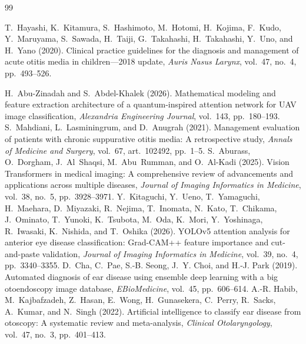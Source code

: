 \documentclass[12pt,a4paper]{report}
\begin{document}
\begin{thebibliography}{99}
\sloppy
\setlength{\itemsep}{0.45\baselineskip}
\setlength{\parskip}{0pt}

T.~Hayashi, K.~Kitamura, S.~Hashimoto, M.~Hotomi, H.~Kojima, F.~Kudo, Y.~Maruyama, S.~Sawada, H.~Taiji, G.~Takahashi, H.~Takahashi, Y.~Uno, and H.~Yano (2020). Clinical practice guidelines for the diagnosis and management of acute otitis media in children---2018 update, \textit{Auris Nasus Larynx}, vol.~47, no.~4, pp.~493--526.

H.~Abu-Zinadah and S.~Abdel-Khalek (2026). Mathematical modeling and feature extraction architecture of a quantum-inspired attention network for UAV image classification, \textit{Alexandria Engineering Journal}, vol.~143, pp.~180--193.
S.~Mahdiani, L.~Lasminingrum, and D.~Anugrah (2021). Management evaluation of patients with chronic suppurative otitis media: A retrospective study, \textit{Annals of Medicine and Surgery}, vol.~67, art.~102492, pp.~1--5.
S.~Aburass, O.~Dorgham, J.~Al~Shaqsi, M.~Abu~Rumman, and O.~Al-Kadi (2025). Vision Transformers in medical imaging: A comprehensive review of advancements and applications across multiple diseases, \textit{Journal of Imaging Informatics in Medicine}, vol.~38, no.~5, pp.~3928--3971.
Y.~Kitaguchi, Y.~Ueno, T.~Yamaguchi, H.~Maehara, D.~Miyazaki, R.~Nejima, T.~Inomata, N.~Kato, T.~Chikama, J.~Ominato, T.~Yunoki, K.~Tsubota, M.~Oda, K.~Mori, Y.~Yoshinaga, R.~Iwasaki, K.~Nishida, and T.~Oshika (2026). YOLOv5 attention analysis for anterior eye disease classification: Grad-CAM++ feature importance and cut-and-paste validation, \textit{Journal of Imaging Informatics in Medicine}, vol.~39, no.~4, pp.~3340--3355.
D.~Cha, C.~Pae, S.-B. Seong, J.~Y. Choi, and H.-J. Park (2019). Automated diagnosis of ear disease using ensemble deep learning with a big otoendoscopy image database, \textit{EBioMedicine}, vol.~45, pp.~606--614.
A.-R. Habib, M.~Kajbafzadeh, Z.~Hasan, E.~Wong, H.~Gunasekera, C.~Perry, R.~Sacks, A.~Kumar, and N.~Singh (2022). Artificial intelligence to classify ear disease from otoscopy: A systematic review and meta-analysis, \textit{Clinical Otolaryngology}, vol.~47, no.~3, pp.~401--413.

\end{thebibliography}
\end{document}
